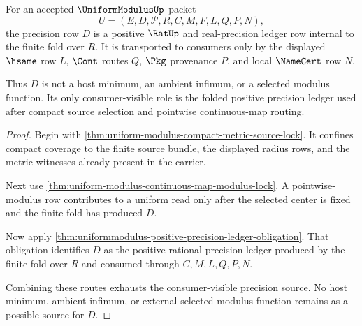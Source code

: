 \begin{theorem}
\label{thm:uniform-modulus-real-precision-ledger-lock}
For an accepted $\UniformModulusUp$ packet
$$
U=(E,D,\mathcal{P},R,C,M,F,L,Q,P,N),
$$
the precision row $D$ is a positive $\RatUp$ and real-precision ledger row internal to the finite fold over $R$. It is transported to consumers only by the displayed $\hsame$ row $L$, $\Cont$ routes $Q$, $\Pkg$ provenance $P$, and local $\NameCert$ row $N$.

Thus $D$ is not a host minimum, an ambient infimum, or a selected modulus function. Its only consumer-visible role is the folded positive precision ledger used after compact source selection and pointwise continuous-map routing.
\end{theorem}
\begin{proof}
Begin with \autoref{thm:uniform-modulus-compact-metric-source-lock}. It confines compact coverage to the finite source bundle, the displayed radius rows, and the metric witnesses already present in the carrier.

Next use \autoref{thm:uniform-modulus-continuous-map-modulus-lock}. A pointwise-modulus row contributes to a uniform read only after the selected center is fixed and the finite fold has produced $D$.

Now apply \autoref{thm:uniformmodulus-positive-precision-ledger-obligation}. That obligation identifies $D$ as the positive rational precision ledger produced by the finite fold over $R$ and consumed through $C,M,L,Q,P,N$.

Combining these routes exhausts the consumer-visible precision source. No host minimum, ambient infimum, or external selected modulus function remains as a possible source for $D$.
\end{proof}

